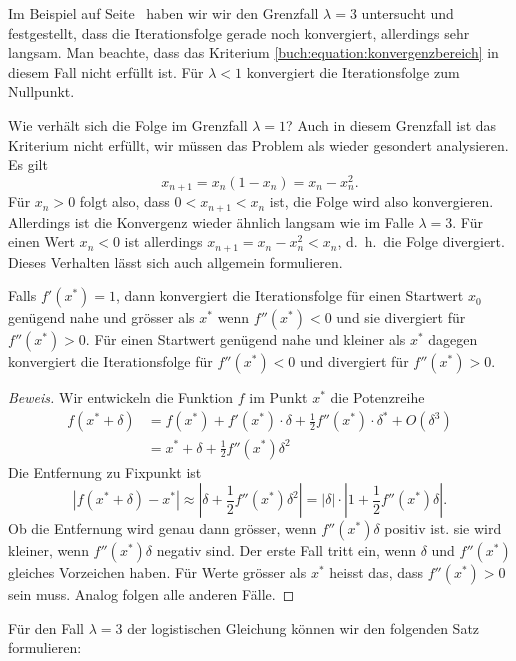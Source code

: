 Im Beispiel auf Seite~\pageref{buch:beispiel:logistisch3} haben wir
wir den Grenzfall $\lambda=3$ untersucht und festgestellt, dass die
Iterationsfolge gerade noch konvergiert, allerdings sehr langsam.
Man beachte, dass das Kriterium \eqref{buch:equation:konvergenzbereich}
in diesem Fall nicht erfüllt ist.
Für $\lambda<1$ konvergiert die Iterationsfolge zum Nullpunkt.

Wie verhält sich die Folge im Grenzfall $\lambda=1$?
Auch in diesem Grenzfall ist das Kriterium nicht erfüllt, wir müssen
das Problem als wieder gesondert analysieren.
Es gilt
\[
x_{n+1} = x_n(1-x_n) = x_n-x_n^2.
\]
Für $x_n>0$ folgt also, dass $0<x_{n+1} < x_n$ ist, die Folge wird also
konvergieren.
Allerdings ist die Konvergenz wieder ähnlich langsam wie im Falle
$\lambda=3$.
Für einen Wert $x_n<0$ ist allerdings $x_{n+1} = x_n - x_n^2 < x_n$,
d.~h.~die Folge divergiert.
Dieses Verhalten lässt sich auch allgemein formulieren.

\begin{satz}
\label{buch:satz:kritischekonvergenz}
Falls $f'(x^*)=1$, dann konvergiert die Iterationsfolge für einen
Startwert $x_0$ genügend nahe und grösser als $x^*$ wenn $f''(x^*)<0$ 
und sie divergiert für $f''(x^*)>0$.
Für einen Startwert genügend nahe und kleiner als $x^*$ dagegen
konvergiert die Iterationsfolge für $f''(x^*)<0$ und divergiert für
$f''(x^*)>0$.
\end{satz}

\begin{proof}[Beweis]
Wir entwickeln die Funktion $f$ im Punkt $x^*$ die Potenzreihe
%
\begin{align*}
f(x^*+\delta)
&=
f(x^*) + f'(x^*)\cdot\delta + \frac12f''(x^*)\cdot \delta^* + O(\delta^3)
\\
&=
x^* + \delta + \frac12f''(x^*)\delta^2
\end{align*}
Die Entfernung zu Fixpunkt ist
\[
|f(x^*+\delta)-x^*|
\approx
|\delta  + \frac12f''(x^*)\delta^2|
=
|\delta|\cdot |1 + \frac12f''(x^*)\delta|.
\]
Ob die Entfernung wird genau dann grösser, wenn $f''(x^*)\delta$ positiv ist.
sie wird kleiner, wenn $f''(x^*)\delta$ negativ sind.
Der erste Fall tritt ein, wenn $\delta$ und $f''(x^*)$ gleiches
Vorzeichen haben.
Für Werte grösser als $x^*$ heisst das, dass $f''(x^*)>0$ sein muss.
Analog folgen alle anderen Fälle.
\end{proof}

Für den Fall $\lambda=3$ der logistischen Gleichung können wir den
folgenden Satz formulieren:

